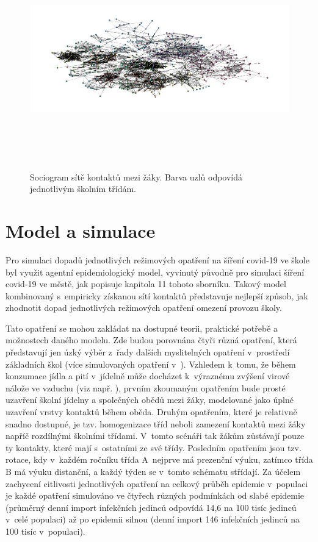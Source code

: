 \begin{figure}[ht]
    \centering
    \includegraphics[width=340pt, height=270pt]{./pic/students_all_classes2.jpg}
    \caption{Sociogram sítě kontaktů mezi žáky. Barva uzlů odpovídá jednotlivým školním třídám.}
    \label{fig:100-teachers}
\end{figure}

\section*{Model a simulace}
Pro simulaci dopadů jednotlivých režimových opatření na šíření covid-19 ve škole byl využit agentní epidemiologický model, vyvinutý původně pro simulaci šíření covid-19 ve městě, jak popisuje kapitola 11 tohoto sborníku. Takový model kombinovaný s~empiricky získanou sítí kontaktů představuje nejlepší způsob, jak zhodnotit dopad jednotlivých režimových opatření omezení provozu školy. 

Tato opatření se mohou zakládat na dostupné teorii, praktické potřebě a možnostech daného modelu. Zde budou porovnána čtyři různá opatření, která představují jen úzký výběr z~řady dalších myslitelných opatření v~prostředí základních škol (více simulovaných opatření v~\cite{Brom2021.06.28.21259628}). Vzhledem k~tomu, že během konzumace jídla a pití v~jídelně může docházet k~výraznému zvýšení virové nálože ve vzduchu (viz např. \cite{Chen_etal2020, eichler2021transmission}), prvním zkoumaným opatřením bude prosté uzavření školní jídelny a společných obědů mezi žáky, modelované jako úplné uzavření vrstvy kontaktů během oběda. Druhým opatřením, které je relativně snadno dostupné, je tzv. homogenizace tříd neboli zamezení kontaktů mezi žáky napříč rozdílnými školními třídami. V~tomto scénáři tak žákům zůstávají pouze ty kontakty, které mají s~ostatními ze své třídy. Posledním opatřením jsou tzv. rotace, kdy v~každém ročníku třída A~nejprve má prezenční výuku, zatímco třída B má výuku distanční, a každý týden se v~tomto schématu střídají. Za účelem zachycení citlivosti jednotlivých opatření na celkový průběh epidemie v~populaci je každé opatření simulováno ve čtyřech různých podmínkách od slabé epidemie (průměrný denní import infekčních jedinců odpovídá 14,6 na 100 tisíc jedinců v~celé populaci) až po epidemii silnou (denní import 146 infekčních jedinců na 100 tisíc v~populaci).


